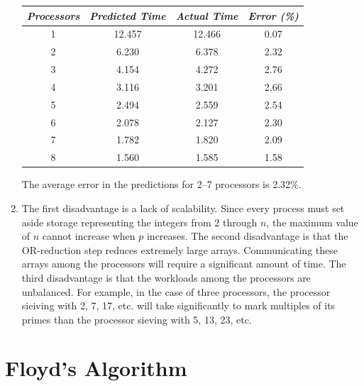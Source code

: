 \begin{enumerate}
\begin{tabular}{|c|c|c|c|}
\hline
{\it Processors}&{\it Predicted Time} & {\it Actual Time} & {\it Error (\%)}\\
\hline
1 & 12.457 & 12.466 & 0.07\\
2 & 6.230 &  6.378  & 2.32\\
3 & 4.154 &  4.272  & 2.76\\
4 & 3.116 &  3.201  & 2.66\\
5 & 2.494 &  2.559  & 2.54\\
6 & 2.078 &  2.127  & 2.30\\
7 & 1.782 &  1.820  & 2.09\\
8 & 1.560 &  1.585  & 1.58\\
\hline
\end{tabular}

The average error in the predictions for 2--7 processors is 2.32\%.

\addtocounter{enumi}{1}
\addtocounter{enumi}{1}
\addtocounter{enumi}{1}
\addtocounter{enumi}{1}

\item The first disadvantage is a lack of scalability.
      Since every process must set aside storage representing the integers
      from 2 through $n$, the maximum value of $n$ cannot increase when
      $p$ increases. The second disadvantage is that the OR-reduction step
      reduces extremely large arrays. Communicating these arrays among the
      processors will require a significant amount of time. The third
      disadvantage is that the workloads among the processors are
      unbalanced. For example, in the case of three processors, the processor
      sieiving with 2, 7, 17, etc. will take significantly to mark multiples
      of its primes than the processor sieving with 5, 13, 23, etc.

\end{enumerate}

\chapter{Floyd's Algorithm}

